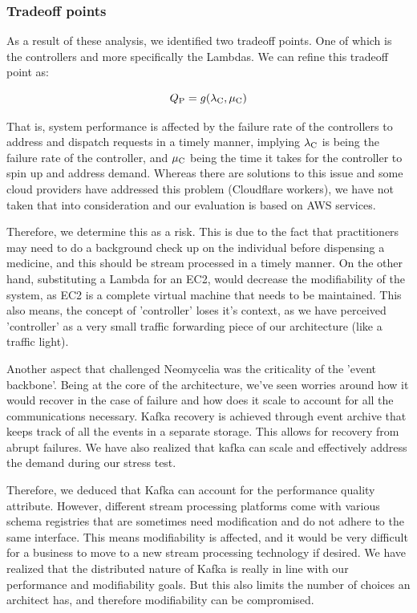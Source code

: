\documentclass[conference]{IEEEtran}
\begin{document}
\subsubsection{Tradeoff points}

As a result of these analysis, we identified two tradeoff points. One of which is the controllers and more specifically the Lambdas. We can refine this tradeoff point as:

\begin{equation}
    Q\textsubscript{P} = g(\lambda \textsubscript{C},
    \mu \textsubscript{C})
\end{equation}

That is, system performance is affected by the failure rate of the controllers to address and dispatch requests in a timely manner, implying $ \lambda \textsubscript{C} $ is being the failure rate of the controller, and  $ \mu \textsubscript{C} $ being the time it takes for the controller to spin up and address demand. Whereas there are solutions to this issue and some cloud providers have addressed this problem (Cloudflare workers), we have not taken that into consideration and our evaluation is based on AWS services.

Therefore, we determine this as a risk. This is due to the fact that practitioners may need to do a background check up on the individual before dispensing a medicine, and this should be stream processed in a timely manner. On the other hand, substituting a Lambda for an EC2, would decrease the modifiability of the system, as EC2 is a complete virtual machine that needs to be maintained. This also means, the concept of 'controller' loses it's context, as we have perceived 'controller' as a very small traffic forwarding piece of our architecture (like a traffic light).

Another aspect that challenged Neomycelia was the criticality of the 'event backbone'. Being at the core of the architecture, we've seen worries around how it would recover in the case of failure and how does it scale to account for all the communications necessary. Kafka recovery is achieved through event archive that keeps track of all the events in a separate storage. This allows for recovery from abrupt failures. We have also realized that kafka can scale and effectively address the demand during our stress test.

Therefore, we deduced that Kafka can account for the performance quality attribute. However, different stream processing platforms come with various schema registries that are sometimes need modification and do not adhere to the same interface. This means modifiability is affected, and it would be very difficult for a business to move to a new stream processing technology if desired. We have realized that the distributed nature of Kafka is really in line with our performance and modifiability goals. But this also limits the number of choices an architect has, and therefore modifiability can be compromised.
\end{document}
